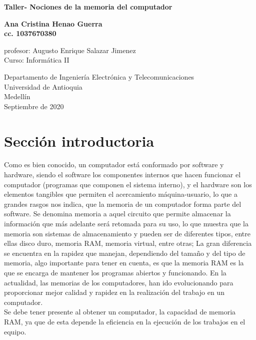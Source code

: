 \documentclass{article}
\begin{document}
\begin{titlepage}
    \begin{center}
        \vspace*{1cm}
            
        \Huge
        \textbf{Taller- Nociones de la memoria del computador}
            
        \vspace{0.5cm}
        \LARGE
        
            
        \vspace{1.5cm}
            
        \textbf{Ana Cristina Henao Guerra}\\
        \textbf{cc. 1037670380}
            
        
        \vspace*{3cm}
        \large{profesor: Augusto Enrique Salazar Jimenez}\\
        Curso: Informática II
        \vfill
            
        \vspace{0.8cm}
            
        \Large
        Departamento de Ingeniería Electrónica y Telecomunicaciones\\
        Universidad de Antioquia\\
        Medellín\\
        Septiembre de 2020
            
    \end{center}
\end{titlepage}

\tableofcontents
\newpage
\section{Sección introductoria}\label{intro}
Como es bien conocido, un computador está conformado por software y hardware, siendo el software los componentes internos que hacen funcionar el computador (programas que componen el sistema interno), y el hardware son los elementos tangibles que permiten el acercamiento máquina-usuario, lo que a grandes rasgos nos indica, que la memoria de un computador forma parte del software. Se denomina memoria a aquel circuito que permite almacenar la información que más adelante será retomada para su uso, lo que muestra que la memoria son sistemas de almacenamiento y pueden ser de diferentes tipos, entre ellas disco duro, memoria RAM, memoria virtual, entre otras; La  gran diferencia se encuentra en la rapidez que manejan, dependiendo del tamaño y del tipo de memoria, algo importante para tener en cuenta, es que la memoria RAM es la que se encarga de mantener los programas abiertos y funcionando.
En la actualidad, las memorias de los computadores, han ido evolucionando para proporcionar mejor calidad y rapidez en la realización del trabajo en un computador.\\
\noindent
Se debe tener presente al obtener un computador, la capacidad de memoria RAM, ya que de esta depende la eficiencia en la ejecución de los trabajos en el equipo.
\end{document}
